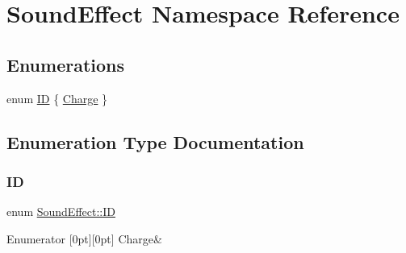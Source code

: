 \hypertarget{namespace_sound_effect}{}\section{Sound\+Effect Namespace Reference}
\label{namespace_sound_effect}
\subsection*{Enumerations}
\begin{DoxyCompactItemize}
\item 
enum \hyperlink{namespace_sound_effect_a11ffbf1eb89e85a34cbfd5a59b2cd9cb}{ID} \{ \hyperlink{namespace_sound_effect_a11ffbf1eb89e85a34cbfd5a59b2cd9cba089c46ca5650d2908d73313697639681}{Charge}
 \}
\end{DoxyCompactItemize}


\subsection{Enumeration Type Documentation}
\mbox{\label{namespace_sound_effect_a11ffbf1eb89e85a34cbfd5a59b2cd9cb}} 
\subsubsection{\texorpdfstring{ID}{ID}}
{\footnotesize\ttfamily enum \hyperlink{namespace_sound_effect_a11ffbf1eb89e85a34cbfd5a59b2cd9cb}{Sound\+Effect\+::\+ID}}

\begin{DoxyEnumFields}{Enumerator}
[0pt][0pt]{}\mbox{\label{namespace_sound_effect_a11ffbf1eb89e85a34cbfd5a59b2cd9cba089c46ca5650d2908d73313697639681}} 
Charge&\\
\hline

\end{DoxyEnumFields}
